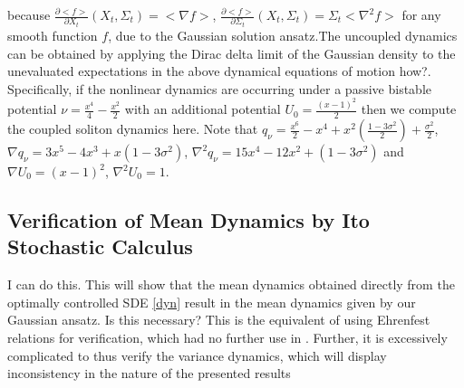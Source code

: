 \documentclass[letterpaper, 12pt]{article}
\begin{document}
because $\frac{\partial \big< f \big>}{\partial X_t}(X_t,\Sigma_t) = \big< \nabla f \big>$, $\frac{\partial \big< f \big>}{\partial \Sigma_t}(X_t,\Sigma_t) = \Sigma_t \big< \nabla^2 f \big>$ for any smooth function $f$, due to the Gaussian solution ansatz.The uncoupled dynamics can be obtained by applying the Dirac delta limit of the Gaussian density to the unevaluated expectations in the above dynamical equations of motion {\color{blue} how?}. \\
Specifically, if the nonlinear dynamics are occurring under a passive bistable potential $\nu = \frac{x^4}{4} - \frac{x^2}{2}$ with an additional potential $U_0 = \frac{(x-1)^2}{2}$ then we compute the coupled soliton dynamics here. Note that $q_\nu = \frac{x^6}{2} - x^4 + x^2\left(\frac{1 - 3\sigma^2}{2}\right) + \frac{\sigma^2}{2}$, $\nabla q_\nu = 3x^5 - 4x^3 + x(1 - 3 \sigma^2)$, $\nabla^2 q_\nu = 15x^4 - 12x^2 + (1 - 3\sigma^2)$ and $\nabla U_0 = (x - 1)^2$, $\nabla^2 U_0 = 1$.

\subsection{Verification of Mean Dynamics by Ito Stochastic Calculus}

{\color{blue} I can do this. This will show that the mean dynamics obtained directly from the optimally controlled SDE \eqref{dyn} result in the mean dynamics given by our Gaussian ansatz. Is this necessary? This is the equivalent of using Ehrenfest relations for verification, which had no further use in \cite{Ullmo2017}. Further, it is excessively complicated to thus verify the variance dynamics, which will display inconsistency in the nature of the presented results}







	
\end{document}
